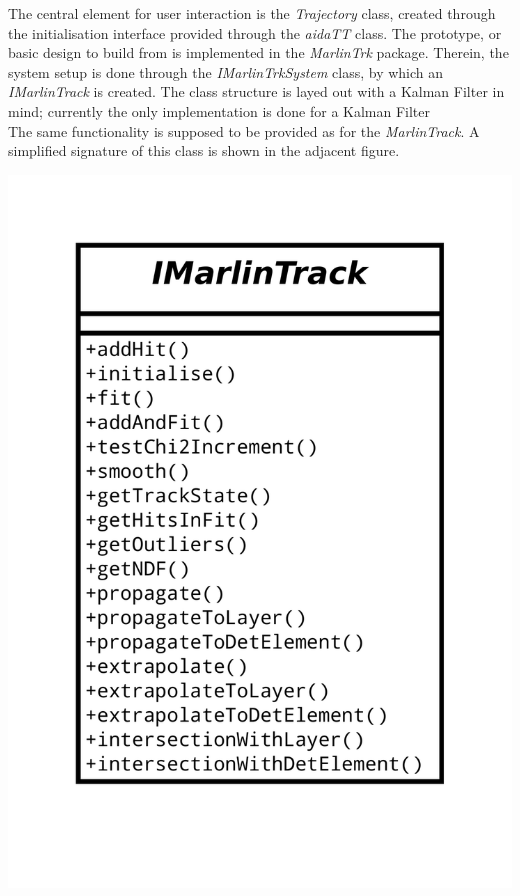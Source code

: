 \documentclass[12pt]{article}
\begin{document}
 \begin{minipage}{0.6\textwidth}%
 The central element for user interaction is the {\em Trajectory} class, created through the initialisation interface provided through the {\em aidaTT} class.
 The prototype, or basic design to build from is implemented in the {\em MarlinTrk} package.
 Therein, the system setup is done through the {\em IMarlinTrkSystem} class, by which an {\em IMarlinTrack} is created.
 The class structure is layed out with a Kalman Filter in mind; currently the only implementation is done for a Kalman Filter
 \\
 The same functionality is supposed to be provided as for the {\em MarlinTrack}.
 A simplified signature of this class is shown in the adjacent figure.%
\end{minipage}%
\begin{minipage}{0.4\textwidth}%
 \includegraphics[width=.9\linewidth]{IMarlinTrk_simplified.pdf}%
\end{minipage}
\end{document}
